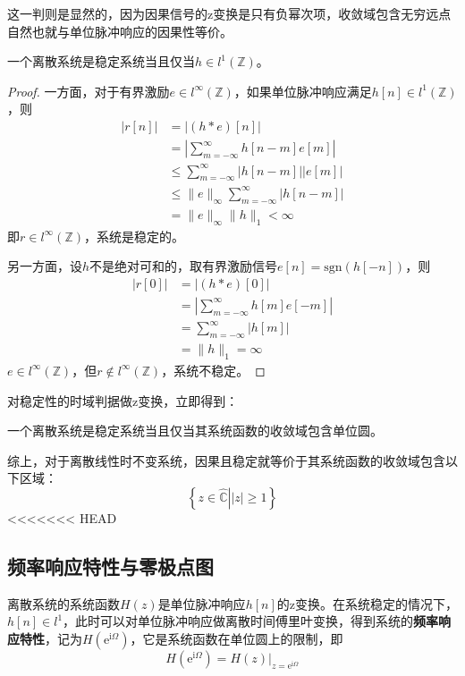 这一判则是显然的，因为因果信号的z变换是只有负幂次项，收敛域包含无穷远点自然也就与单位脉冲响应的因果性等价。

\begin{proposition}[稳定性的时域判则]
    一个离散系统是稳定系统当且仅当$h\in l^1(\mathbb{Z})$。
\end{proposition}
\begin{proof}
    一方面，对于有界激励$e\in l^{\infty}(\mathbb{Z})$，如果单位脉冲响应满足$h[n]\in l^1(\mathbb{Z})$，则
    \begin{align*}
        |r[n]|&=|(h*e)[n]|\\
        &=\left|\sum_{m=-\infty}^{\infty}h[n-m]e[m]\right|\\
        &\leq \sum_{m=-\infty}^{\infty}|h[n-m]||e[m]|\\
        &\leq \|e\|_{\infty}\sum_{m=-\infty}^{\infty}|h[n-m]|\\
        &=\|e\|_{\infty}\|h\|_1<\infty
    \end{align*}
    即$r\in l^{\infty}(\mathbb{Z})$，系统是稳定的。
    
    另一方面，设$h$不是绝对可和的，取有界激励信号$e[n]=\text{sgn}(h[-n])$，则
    \begin{align*}
        |r[0]|&=|(h*e)[0]|\\
        &=\left|\sum_{m=-\infty}^{\infty}h[m]e[-m]\right|\\
        &=\sum_{m=-\infty}^{\infty}|h[m]|\\
        &=\|h\|_1=\infty
    \end{align*}
    $e\in l^{\infty}(\mathbb{Z})$，但$r\notin l^{\infty}(\mathbb{Z})$，系统不稳定。
\end{proof}

对稳定性的时域判据做z变换，立即得到：

\begin{proposition}[稳定性的z域判则]
    一个离散系统是稳定系统当且仅当其系统函数的收敛域包含单位圆。
\end{proposition}

综上，对于离散线性时不变系统，因果且稳定就等价于其系统函数的收敛域包含以下区域：
\[\left\{\left.z\in\hat{\mathbb{C}}\right||z|\geq 1\right\}\]
<<<<<<< HEAD

\subsection{频率响应特性与零极点图}\label{sub:discrete_system_freq_response}

离散系统的系统函数$H(z)$是单位脉冲响应$h[n]$的z变换。在系统稳定的情况下，$h[n]\in l^1$，此时可以对单位脉冲响应做离散时间傅里叶变换，得到系统的\textbf{频率响应特性}，记为$H(\mathrm{e}^{\mathrm{i}\Omega})$，它是系统函数在单位圆上的限制，即
$$H(\mathrm{e}^{\mathrm{i}\Omega})=H(z)|_{z=\mathrm{e}^{\mathrm{i}\Omega}}$$

